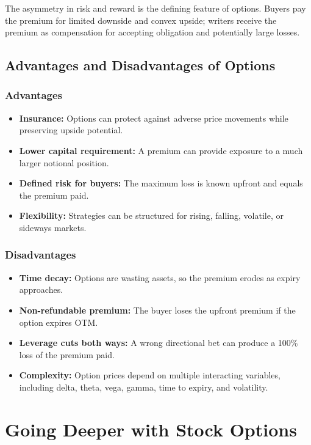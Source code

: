 \documentclass[12pt,openany]{book}
\begin{document}
The asymmetry in risk and reward is the defining feature of options. Buyers pay the premium for limited downside and convex upside; writers receive the premium as compensation for accepting obligation and potentially large losses.

\subsection{Advantages and Disadvantages of Options}

\subsubsection{Advantages}

\begin{itemize}[leftmargin=*]
    \item \textbf{Insurance:} Options can protect against adverse price movements while preserving upside potential.
    \item \textbf{Lower capital requirement:} A premium can provide exposure to a much larger notional position.
    \item \textbf{Defined risk for buyers:} The maximum loss is known upfront and equals the premium paid.
    \item \textbf{Flexibility:} Strategies can be structured for rising, falling, volatile, or sideways markets.
\end{itemize}

\subsubsection{Disadvantages}

\begin{itemize}[leftmargin=*]
    \item \textbf{Time decay:} Options are wasting assets, so the premium erodes as expiry approaches.
    \item \textbf{Non-refundable premium:} The buyer loses the upfront premium if the option expires OTM.
    \item \textbf{Leverage cuts both ways:} A wrong directional bet can produce a 100\% loss of the premium paid.
    \item \textbf{Complexity:} Option prices depend on multiple interacting variables, including delta, theta, vega, gamma, time to expiry, and volatility.
\end{itemize}

\section{Going Deeper with Stock Options}
\end{document}
